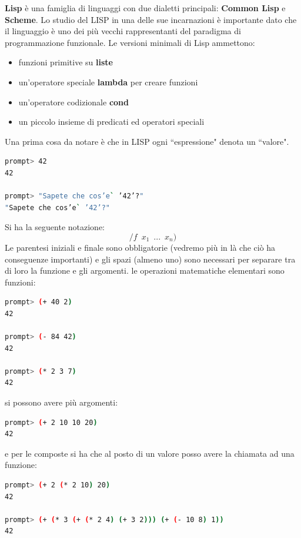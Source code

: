 \documentclass[a4paper,12pt, oneside]{book}
\begin{document}
\textbf{Lisp} è una famiglia di linguaggi con due dialetti principali: \textbf{Common Lisp} e \textbf{Scheme}. Lo studio del LISP in una delle sue incarnazioni è importante dato che il linguaggio è uno dei più vecchi rappresentanti del paradigma di programmazione funzionale. Le versioni minimali di Lisp ammettono:
\begin{itemize}
\item funzioni primitive su \textbf{liste}
\item un'operatore speciale \textbf{lambda} per creare funzioni
\item un'operatore codizionale \textbf{cond}
\item un piccolo insieme di predicati ed operatori speciali
\end{itemize}
Una prima cosa da notare è che in LISP ogni “espressione" denota un
“valore".
\begin{shaded}
\begin{lstlisting}[language=bash]
prompt> 42
42

prompt> "Sapete che cos’e` ’42’?"
"Sapete che cos’e` ’42’?"
\end{lstlisting}
\end{shaded} Si ha la seguente notazione:
$$/f\,\,\, x_1\,\,\,...\,\,\, x_n)$$
Le parentesi iniziali e finale sono obbligatorie (vedremo più in là
che ciò ha conseguenze importanti) e gli spazi (almeno uno)
sono necessari per separare tra di loro la funzione e gli argomenti.
le operazioni matematiche elementari sono funzioni:
\begin{shaded}
\begin{lstlisting}[language=bash]
prompt> (+ 40 2)
42

prompt> (- 84 42)
42

prompt> (* 2 3 7)
42
\end{lstlisting}
\end{shaded}
si possono avere più argomenti:
\begin{shaded}
\begin{lstlisting}[language=bash]
prompt> (+ 2 10 10 20)
42
\end{lstlisting}
\end{shaded}
e per le composte si ha che al posto di un valore posso avere la chiamata ad una funzione: 
\begin{shaded}
\begin{lstlisting}[language=bash]
prompt> (+ 2 (* 2 10) 20)
42

prompt> (+ (* 3 (+ (* 2 4) (+ 3 2))) (+ (- 10 8) 1))
42
\end{lstlisting}
\end{shaded}
\end{document}
